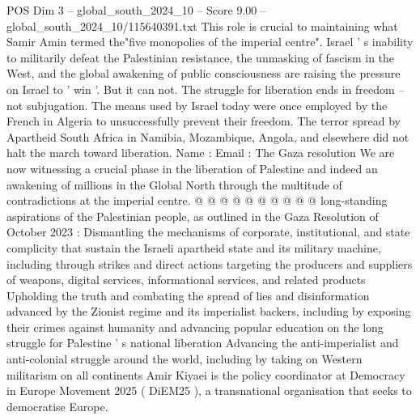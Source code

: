 \begin{textsample}{POS Dim 3 – global\_south\_2024\_10 – Score 9.00 – global\_south\_2024\_10/115640391.txt}
This role is crucial to maintaining what Samir Amin termed the"five monopolies of the imperial centre".
Israel ' s inability to militarily defeat the Palestinian resistance, the unmasking of fascism in the West, and the global awakening of public consciousness are raising the pressure on Israel to ' win '.
But it can not.
The struggle for liberation ends in freedom -- not subjugation.
The means used by Israel today were once employed by the French in Algeria to unsuccessfully prevent their freedom.
The terror spread by Apartheid South Africa in Namibia, Mozambique, Angola, and elsewhere did not halt the march toward liberation.
Name : Email : The Gaza resolution We are now witnessing a crucial phase in the liberation of Palestine and indeed an awakening of millions in the Global North through the multitude of contradictions at the imperial centre. @ @ @ @ @ @ @ @ @ @ long-standing aspirations of the Palestinian people, as outlined in the Gaza Resolution of October 2023 : Dismantling the mechanisms of corporate, institutional, and state complicity that sustain the Israeli apartheid state and its military machine, including through strikes and direct actions targeting the producers and suppliers of weapons, digital services, informational services, and related products Upholding the truth and combating the spread of lies and disinformation advanced by the Zionist regime and its imperialist backers, including by exposing their crimes against humanity and advancing popular education on the long struggle for Palestine ' s national liberation Advancing the anti-imperialist and anti-colonial struggle around the world, including by taking on Western militarism on all continents Amir Kiyaei is the policy coordinator at Democracy in Europe Movement 2025 ( DiEM25 ), a transnational organisation that seeks to democratise Europe.

\end{textsample}
